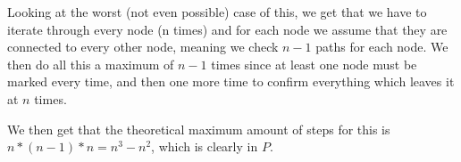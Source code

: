 \documentclass{article}
\begin{document}
	Looking at the worst (not even possible) case of this, we get that 
	we have to iterate through every node (n times) and for each node 
	we assume that they are connected to every other node, meaning we 
	check $n-1$ paths for each node. We then do all this a maximum of 
	$n-1$ times since at least one node must be marked every time, and 
	then one more time to confirm everything which leaves it at $n$ times.

	We then get that the theoretical maximum amount of steps for this is 
	$n * (n-1) * n = n^3 - n^2$, which is clearly in $P$.
\end{document}
